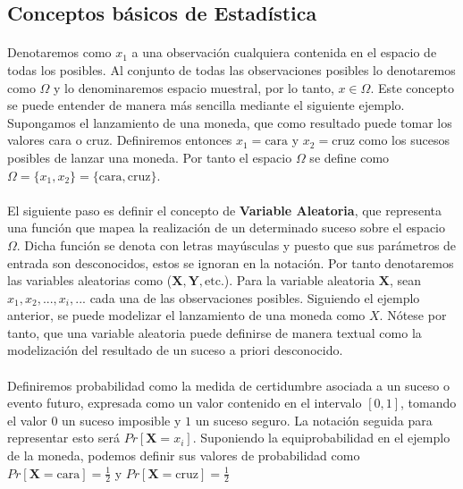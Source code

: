 \documentclass{subfiles}
\begin{document}
      \subsection{Conceptos básicos de Estadística}
      \label{sec:basic_statistics}

        \paragraph{}
        Denotaremos como $x_1$ a una observación cualquiera contenida en el espacio de todas los posibles. Al conjunto de todas las observaciones posibles lo denotaremos como $\Omega$ y lo denominaremos espacio muestral, por lo tanto, $x \in \Omega$. Este concepto se puede entender de manera más sencilla mediante el siguiente ejemplo. Supongamos el lanzamiento de una moneda, que como resultado puede tomar los valores cara o cruz. Definiremos entonces $x_1 = \text{cara}$ y $x_2 = \text{cruz}$ como los sucesos posibles de lanzar una moneda. Por tanto el espacio $\Omega$ se define como $\Omega = \{x_1, x_2\} = \{\text{cara}, \text{cruz}\}$.

        \paragraph{}
        El siguiente paso es definir el concepto de \textbf{Variable Aleatoria}, que representa una función que mapea la realización de un determinado suceso sobre el espacio $\Omega$. Dicha función se denota con letras mayúsculas y puesto que sus parámetros de entrada son desconocidos, estos se ignoran en la notación. Por tanto denotaremos las variables aleatorias como ($\boldsymbol{X}, \boldsymbol{Y}, \text{etc.}$). Para la variable aleatoria $\boldsymbol{X}$, sean $x_1, x_2, ..., x_i,...$ cada una de las observaciones posibles. Siguiendo el ejemplo anterior, se puede modelizar el lanzamiento de una moneda como $X$. Nótese por tanto, que una variable aleatoria puede definirse de manera textual como la modelización del resultado de un suceso a priori desconocido.

        \paragraph{}
        Definiremos probabilidad como la medida de certidumbre asociada a un suceso o evento futuro, expresada como un valor contenido en el intervalo $[0,1]$, tomando el valor $0$ un suceso imposible y $1$ un suceso seguro. La notación seguida para representar esto será $Pr[\boldsymbol{X} = x_i]$. Suponiendo la equiprobabilidad en el ejemplo de la moneda, podemos definir sus valores de probabilidad como $Pr[\boldsymbol{X} = \text{cara}] = \tfrac{1}{2}$ y $Pr[\boldsymbol{X} = \text{cruz}] = \tfrac{1}{2}$
\end{document}

